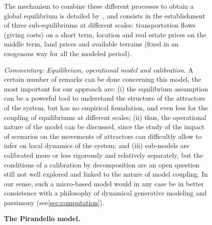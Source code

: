 \documentclass[galley]{jtlu-article-2col}
\begin{document}
\begin{figure}
\begin{mdframed}
	
	The mechanism to combine these different processes to obtain a global equilibrium is detailed by~\cite{kryvobokov2013comparison}, and consists in the establishment of three sub-equilibriums at different scales: transportation flows (giving costs) on a short term, location and real estate prices on the middle term, land prices and available terrains (fixed in an exogenous way for all the modeled period).
	
	\bigskip
	
	
	\textit{Commentary: Equilibrium, operational model and calibration.} A certain number of remarks can be done concerning this model, the most important for our approach are: (i) the equilibrium assumption can be a powerful tool to understand the structure of the attractors of the system, but has no empirical foundation, and even less for the coupling of equilibriums at different scales; (ii) thus, the operational nature of the model can be discussed, since the study of the impact of scenarios on the movements of attractors can difficultly allow to infer on local dynamics of the system; and (iii) sub-models are calibrated more or less rigorously and relatively separately, but the conditions of a calibration by decomposition are an open question still not well explored and linked to the nature of model coupling. In our sense, such a micro-based model would in any case be in better consistence with a philosophy of dynamical generative modeling and parsimony (see\ref{sec:computation}).
	
	\medskip
	
	\textbf{The Pirandello model.}\label{frame:modelingsa:pirandello}
	
	\end{mdframed}
\end{figure}

	
	
	
	
\end{document}
